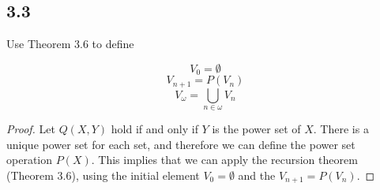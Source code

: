 \subsection*{3.3} Use Theorem 3.6 to define

$$V_0 = \emptyset$$
$$V_{n+1} = P(V_n)$$
$$V_{\omega} = \bigcup_{n \in \omega} V_n$$

\begin{proof}
    Let $Q(X,Y)$ hold if and only if $Y$ is the power set of $X$. There is a unique power set for each set, and therefore we can define the power set operation $P(X)$. This implies that we can apply the recursion theorem (Theorem 3.6), using the initial element $V_0 = \emptyset$ and the $V_{n+1} = P(V_n)$.
\end{proof}

